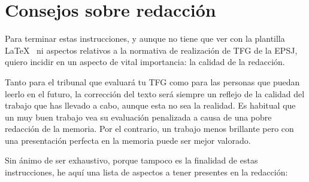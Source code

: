 \section{Consejos sobre redacción}

Para terminar estas instrucciones, y aunque no tiene que ver con la plantilla \LaTeX~ ni aspectos relativos a la normativa de realización de TFG de la EPSJ, quiero incidir en un aspecto de vital importancia: la calidad de la redacción.

Tanto para el tribunal que evaluará tu TFG como para las personas que puedan leerlo en el futuro, la corrección del texto será siempre un reflejo de la calidad del trabajo que has llevado a cabo, aunque esta no sea la realidad. Es habitual que un muy buen trabajo vea su evaluación penalizada a causa de una pobre redacción de la memoria. Por el contrario, un trabajo menos brillante pero con una presentación perfecta en la memoria puede ser mejor valorado.

Sin ánimo de ser exhaustivo, porque tampoco es la finalidad de estas instrucciones, he aquí una lista de aspectos a tener presentes en la redacción:

